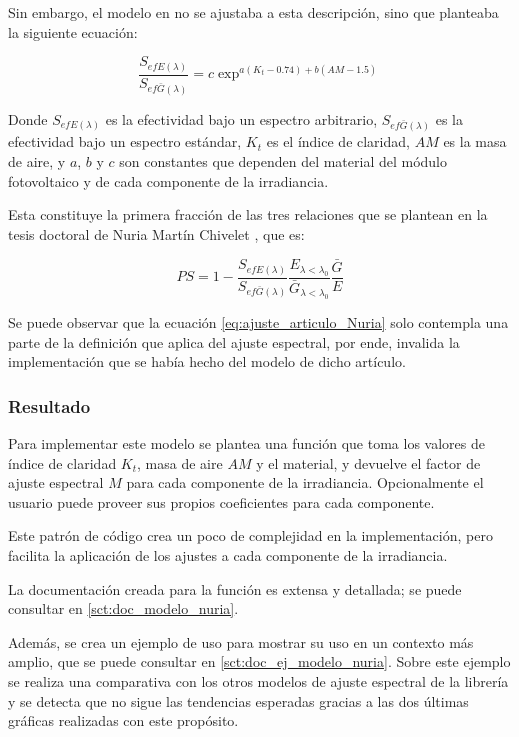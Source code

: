 Sin embargo, el modelo en \cite{Martín_Ruiz_1999} no se ajustaba a esta descripción, sino que planteaba la siguiente ecuación:

\begin{equation} \label{eq:ajuste_articulo_Nuria}
    \frac{S_{efE(\lambda)}}{S_{ef\bar{G}(\lambda)}} = c \exp^{a (K_t - 0.74) + b (AM - 1.5)}
\end{equation}

Donde $S_{efE(\lambda)}$ es la efectividad bajo un espectro arbitrario, $S_{ef\bar{G}(\lambda)}$ es la efectividad bajo un espectro estándar, $K_t$ es el índice de claridad, $AM$ es la masa de aire, y $a$, $b$ y $c$ son constantes que dependen del material del módulo fotovoltaico y de cada componente de la irradiancia.

Esta constituye la primera fracción de las tres relaciones que se plantean en la tesis doctoral de Nuria Martín Chivelet \cite{Martín_Chivelet_1999}, que es:

\begin{equation}
    PS = 1 - \frac{S_{efE(\lambda)}}{S_{ef\bar{G}(\lambda)}}\frac{E_{\lambda<\lambda_0}}{\bar{G}_{\lambda<\lambda_0}}\frac{\bar{G}}{E}
\end{equation}

Se puede observar que la ecuación \ref{eq:ajuste_articulo_Nuria} solo contempla una parte de la definición que aplica del ajuste espectral, por ende, invalida la implementación que se había hecho del modelo de dicho artículo.

\subsubsection{Resultado}

Para implementar este modelo se plantea una función que toma los valores de índice de claridad $K_t$, masa de aire $AM$ y el material, y devuelve el factor de ajuste espectral $M$ para cada componente de la irradiancia. Opcionalmente el usuario puede proveer sus propios coeficientes para cada componente.

Este patrón de código crea un poco de complejidad en la implementación, pero facilita la aplicación de los ajustes a cada componente de la irradiancia.

La documentación creada para la función es extensa y detallada; se puede consultar en \ref{sct:doc_modelo_nuria}.

Además, se crea un ejemplo de uso para mostrar su uso en un contexto más amplio, que se puede consultar en \ref{sct:doc_ej_modelo_nuria}. Sobre este ejemplo se realiza una comparativa con los otros modelos de ajuste espectral de la librería y se detecta que no sigue las tendencias esperadas gracias a las dos últimas gráficas realizadas con este propósito.

